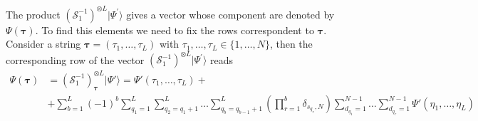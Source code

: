 \documentclass[10pt]{article}
\numberwithin{equation}{section}
\numberwithin{equation}{subsection}
\begin{document}

		The product $\left(\mathcal{S}_{1}^{-1}\right)^{\otimes L}|\Psi^{'}\rangle$ gives a vector whose component are denoted by $\Psi(\bm{\tau})$. 
		To find this elements we need to fix the rows correspondent to $\bm{\tau}$. Consider a string $\bm{\tau}=(\tau_{1},\ldots,\tau_{L})$ with $\tau_{1},\ldots,\tau_{L}\in \{1,\ldots,N\}$, then the corresponding row of the vector $\left(\mathcal{S}_{1}^{-1}\right)^{\otimes L}|\Psi^{'}\rangle$ reads
		\begin{equation}
			\begin{split}
				\Psi(\bm{\tau}) &=\left(\mathcal{S}_{1}^{-1}\right)^{\otimes L}_{\bm{\tau}}|\Psi{'}\rangle=\Psi{'}(\tau_{1},\ldots,\tau_{L})+ 
				\\&
				+\sum_{b=1}^{L}(-1)^{b}\sum_{q_{1}=1}^{L}\sum_{q_{2}=q_{1}+1}^{L}\ldots\sum_{q_{b}=q_{b-1}+1}^{L}\left(\prod_{r=1}^{b}\delta_{s_{q_{r}},N}\right)\sum_{d_{q_{1}}=1}^{N-1}\ldots\sum_{d_{q_{r}}=1}^{N-1}\Psi{'}(\eta_{1},\ldots,\eta_{L})
			\end{split}
		\end{equation}
\end{document}
